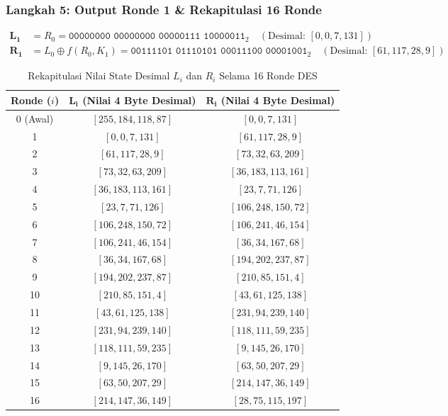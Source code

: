 \documentclass[11pt,a4paper]{article}
\begin{document}
\subsubsection*{Langkah 5: Output Ronde 1 \& Rekapitulasi 16 Ronde}
\begin{align*}
\mathbf{L_1} &= R_0 = \texttt{00000000 00000000 00000111 10000011}_2 \quad (\text{Desimal: } [0, 0, 7, 131]) \\
\mathbf{R_1} &= L_0 \oplus f(R_0, K_1) = \texttt{00111101 01110101 00011100 00001001}_2 \quad (\text{Desimal: } [61, 117, 28, 9])
\end{align*}

\begin{table}[H]
\centering
\small
\caption{Rekapitulasi Nilai State Desimal $L_i$ dan $R_i$ Selama 16 Ronde DES}
\vspace{0.2cm}
\begin{tabular}{ccc}
\toprule
\textbf{Ronde ($i$)} & $\mathbf{L_i}$ \textbf{(Nilai 4 Byte Desimal)} & $\mathbf{R_i}$ \textbf{(Nilai 4 Byte Desimal)} \\
\midrule
0 (Awal) & $[255, 184, 118, 87]$ & $[0, 0, 7, 131]$ \\
1  & $[0, 0, 7, 131]$      & $[61, 117, 28, 9]$ \\
2  & $[61, 117, 28, 9]$    & $[73, 32, 63, 209]$ \\
3  & $[73, 32, 63, 209]$   & $[36, 183, 113, 161]$ \\
4  & $[36, 183, 113, 161]$ & $[23, 7, 71, 126]$ \\
5  & $[23, 7, 71, 126]$    & $[106, 248, 150, 72]$ \\
6  & $[106, 248, 150, 72]$ & $[106, 241, 46, 154]$ \\
7  & $[106, 241, 46, 154]$ & $[36, 34, 167, 68]$ \\
8  & $[36, 34, 167, 68]$   & $[194, 202, 237, 87]$ \\
9  & $[194, 202, 237, 87]$ & $[210, 85, 151, 4]$ \\
10 & $[210, 85, 151, 4]$   & $[43, 61, 125, 138]$ \\
11 & $[43, 61, 125, 138]$  & $[231, 94, 239, 140]$ \\
12 & $[231, 94, 239, 140]$ & $[118, 111, 59, 235]$ \\
13 & $[118, 111, 59, 235]$ & $[9, 145, 26, 170]$ \\
14 & $[9, 145, 26, 170]$   & $[63, 50, 207, 29]$ \\
15 & $[63, 50, 207, 29]$   & $[214, 147, 36, 149]$ \\
16 & $[214, 147, 36, 149]$ & $[28, 75, 115, 197]$ \\
\bottomrule
\end{tabular}
\end{table}
\end{document}
